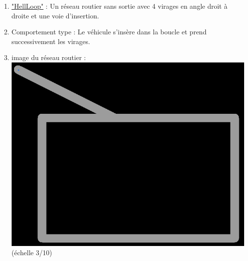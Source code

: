 \documentclass[a4paper,11pt]{article}
\begin{document}
\begin{enumerate}[label=-]
\begin{enumerate}[label=\Alph*)]
\begin{enumerate}[label=$\square$]
\item \underline{"HellLoop"} : Un réseau routier sans sortie avec 4 virages en angle droit à droite et une voie d'insertion.
\item Comportement type : Le véhicule s'insère dans la boucle et prend successivement les virages.
\item image du réseau routier :\\
\includegraphics[scale=0.3]{HellLoop.png}(échelle 3/10)
\end{enumerate} %


\end{enumerate}
\end{enumerate}
\end{document}
